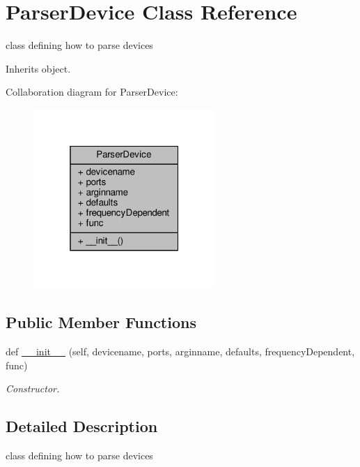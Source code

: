 \hypertarget{classSignalIntegrity_1_1Parsers_1_1Devices_1_1DeviceParser_1_1ParserDevice}{}\section{Parser\+Device Class Reference}
\label{classSignalIntegrity_1_1Parsers_1_1Devices_1_1DeviceParser_1_1ParserDevice}


class defining how to parse devices  




Inherits object.



Collaboration diagram for Parser\+Device\+:
\nopagebreak
\begin{figure}[H]
\begin{center}
\leavevmode
\includegraphics[width=196pt]{classSignalIntegrity_1_1Parsers_1_1Devices_1_1DeviceParser_1_1ParserDevice__coll__graph}
\end{center}
\end{figure}
\subsection*{Public Member Functions}
\begin{DoxyCompactItemize}
\item 
def \hyperlink{classSignalIntegrity_1_1Parsers_1_1Devices_1_1DeviceParser_1_1ParserDevice_ac11c3f53e8e6927c672d9f9f0aa5b933}{\+\_\+\+\_\+init\+\_\+\+\_\+} (self, devicename, ports, arginname, defaults, frequency\+Dependent, func)
\begin{DoxyCompactList}\small\item\em Constructor. \end{DoxyCompactList}\end{DoxyCompactItemize}


\subsection{Detailed Description}
class defining how to parse devices 

